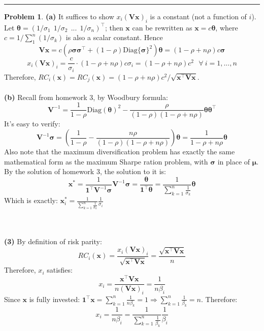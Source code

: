 \documentclass[a4paper, 8pt]{article}
\theoremstyle{definition}
\newtheorem{problem}{Problem}
\theoremstyle{hSol}
\begin{document}
\noindent\rule{16cm}{0.4pt}
\begin{problem} \textbf{(a)} It suffices to show $x_i(\bm{Vx})_i$ is a constant (not a function of $i$). Let $\bm{\theta}=(1/\sigma_1~~1/\sigma_2~~...~~1/\sigma_n)^{\top}$; then $\bm{x}$ can be rewritten as $\bm{x}=c\bm{\theta}$, where $c=1/\sum_1^n(1/\sigma_k)$ is also a scalar constant. Hence
\begin{equation}
	\bm{Vx} = c\left(\rho \bm{\sigma}\bm{\sigma}^{\top} + (1-\rho)\text{Diag}\{ \bm{\sigma} \}^2\right) \bm{\theta}=\left(1-\rho+n\rho \right)c\bm{\sigma}
\end{equation}
\begin{equation}
	x_i(\bm{Vx})_i = \frac{c}{\sigma_i}\cdot \left(1-\rho+n\rho\right)c\sigma_i = \left(1-\rho+n\rho\right)c^2~~~\forall~i=1,...,n
\end{equation}
Therefore, $RC_i(\bm{x}) = RC_j(\bm{x}) = \left(1-\rho+n\rho\right)c^2 / \sqrt{\bm{x}^{\top} \bm{V} \bm{x}}$. \\
~\\
\textbf{(b)} Recall from homework 3, by Woodbury formula:
\begin{equation}
	\bm{V}^{-1} = \frac{1}{1-\rho}\text{Diag}(\bm{\theta})^2 - \frac{\rho}{(1-\rho)(1-\rho+n\rho)} \bm{\theta}\bm{\theta}^{\top}
\end{equation}
It's easy to verify:
\begin{equation}
	\bm{V}^{-1} \bm{\sigma} = \left(\frac{1}{1-\rho}- \frac{n\rho}{(1-\rho)(1-\rho+n\rho)}\right) \bm{\theta} =\frac{1}{1-\rho+n\rho} \bm{\theta}
\end{equation}
Also note that the maximum diversification problem has exactly the same mathematical form as the maximum Sharpe ration problem, with $\bm{\sigma}$ in place of $\bm{\mu}$. By the solution of homework 3, the solution to it is:
\begin{equation}
	\bm{x}^* = \frac{1}{\bm{1}^{\top} \bm{V}^{-1} \bm{\sigma}} \bm{V}^{-1} \bm{\sigma} = \frac{\bm{\theta}}{\bm{1}^{\top} \bm{\theta}} = \frac{1}{\sum_{k=1}^n \frac{1}{\sigma_k}} \bm{\theta}
\end{equation}
Which is exactly: $\bm{x}_i^* = \frac{1}{\sum_{k=1}^n \frac{1}{\sigma_k}} \frac{1}{\sigma_i}$
\end{problem}
~\\
~\\
\textbf{(3)} By definition of risk parity:
\begin{equation}
	RC_i(\bm{x}) =  \frac{x_i (\bm{Vx})_i}{ \sqrt{\bm{x}^{\top} \bm{V}\bm{x}}} = \frac{\sqrt{\bm{x}^{\top} \bm{V}\bm{x}}}{n}
\end{equation}
Therefore, $x_i$ satisfies:
\begin{equation}
	x_i = \frac{\bm{x}^{\top} \bm{V} \bm{x}}{n(\bm{Vx})_i} =  \frac{1}{n\beta_i}
\end{equation}
Since $\bm{x}$ is fully invested: $\bm{1}^{\top} \bm{x} = \sum_{k=1}^n \frac{1}{n\beta_k} = 1 \Rightarrow \sum_{k=1}^n \frac{1}{\beta_k} = n$. Therefore:
\begin{equation}
	x_i =  \frac{1}{n\beta_i} = \frac{1}{\sum_{k=1}^n \frac{1}{\beta_k}}\frac{1}{\beta_i}
\end{equation}
\end{document}

